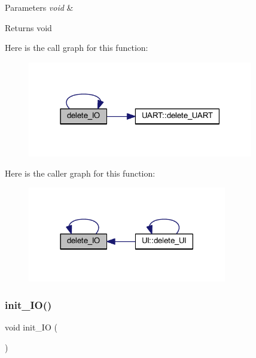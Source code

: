 \begin{DoxyParams}{Parameters}
{\em void} & \\
\hline
\end{DoxyParams}
\begin{DoxyReturn}{Returns}
void 
\end{DoxyReturn}
Here is the call graph for this function\+:\nopagebreak
\begin{figure}[H]
\begin{center}
\leavevmode
\includegraphics[width=279pt]{namespace_i_o_a71df3822c66f8b597b92e7e906a9d61f_cgraph}
\end{center}
\end{figure}
Here is the caller graph for this function\+:\nopagebreak
\begin{figure}[H]
\begin{center}
\leavevmode
\includegraphics[width=246pt]{namespace_i_o_a71df3822c66f8b597b92e7e906a9d61f_icgraph}
\end{center}
\end{figure}
\mbox{\label{namespace_i_o_a83055f0dd9e551c9e898a69d48530663}} 
\subsubsection{\texorpdfstring{init\+\_\+\+I\+O()}{init\_IO()}}
{\footnotesize\ttfamily void init\+\_\+\+IO (\begin{DoxyParamCaption}{ }\end{DoxyParamCaption})}



